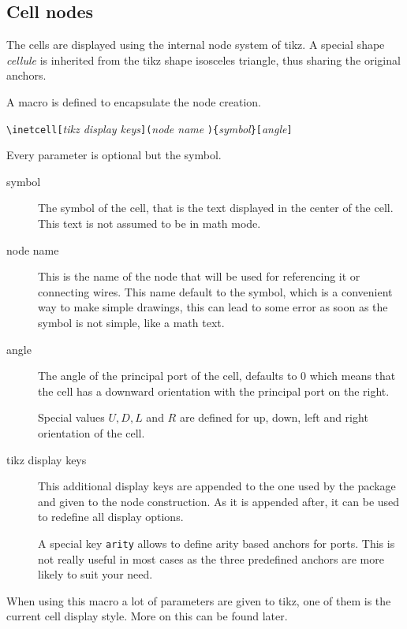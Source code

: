 \documentclass[10pt,a4paper]{article}
\begin{document}
\subsection{Cell nodes}
The cells are displayed using the internal node system of tikz.
A special shape \emph{cellule} is inherited from the tikz shape 
isosceles triangle, thus sharing the original anchors.

A macro is defined to encapsulate the node creation.

\verb+\inetcell[+\emph{tikz display keys}\verb+](+\emph{node name}%
\verb+){+\emph{symbol}\verb+}[+\emph{angle}\verb+]+

Every parameter is optional but the symbol.

\begin{description}
    \item[symbol] The symbol of the cell, that is the text displayed
        in the center of the cell. This text is not assumed to be
        in math mode.
    \item[node name] This is the name of the node that will be
        used for referencing it or connecting wires. This name
        default to the symbol, which is a convenient way to make simple
        drawings, this can lead to some error as soon as the symbol
        is not simple, like a math text.
    \item[angle] The angle of the principal port of the cell,
        defaults to $0$ which means that the cell has a downward
        orientation with the principal port on the right.

        Special values $U,D,L$ and $R$ are defined for up, down, left and right
        orientation of the cell.
    \item[tikz display keys] This additional display keys are 
        appended to the one used by the package and given to the
        node construction. As it is appended after, it can be used to 
        redefine all display options.

        A special key \verb+arity+ allows to define arity based anchors
        for ports. This is not really useful in most cases as the
        three predefined anchors are more likely to suit your need.
\end{description}

When using this macro a lot of parameters are given to tikz, one of
them is the current cell display style. More on this can be found later.
\end{document}

